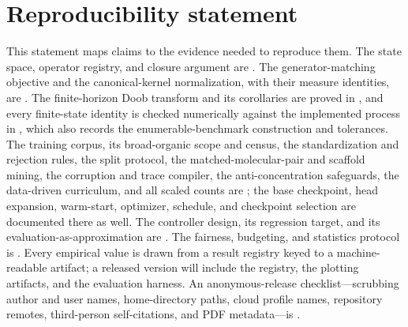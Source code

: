 \section*{Reproducibility statement}
\label{sec:reproducibility}
This statement maps claims to the evidence needed to reproduce them. The state space, operator registry,
and closure argument are . The generator-matching objective
and the canonical-kernel normalization, with their measure identities, are .
The finite-horizon Doob transform and its corollaries are proved in , and every finite-state identity is checked numerically against the implemented process in
, which also records the enumerable-benchmark construction and tolerances. The training
corpus, its broad-organic scope and census, the standardization and rejection rules, the split protocol,
the matched-molecular-pair and scaffold mining, the corruption and trace compiler, the anti-concentration
safeguards, the data-driven curriculum, and all scaled counts are ; the base checkpoint,
head expansion, warm-start, optimizer, schedule, and checkpoint selection are documented there as well.
The controller design, its regression target, and its evaluation-as-approximation are
. The fairness, budgeting, and statistics protocol is . Every
empirical value is drawn from a result registry keyed to a machine-readable artifact; a released version
will include the registry, the plotting artifacts, and the evaluation harness. An anonymous-release
checklist---scrubbing author and user names, home-directory paths, cloud profile names, repository
remotes, third-person self-citations, and PDF metadata---is .
